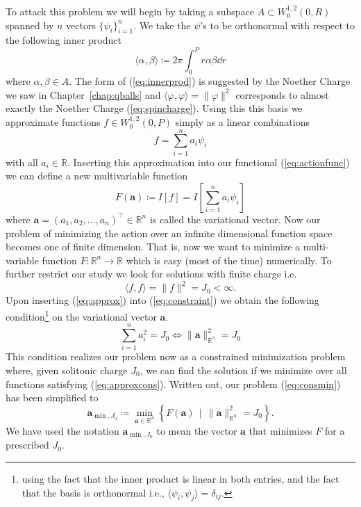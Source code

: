 To attack this problem we will begin by taking a subspace
\(A\subset W^{1,2}_0(0,R)\) spanned by \(n\) vectors \(\{\psi_i\}_{i = 1}^n\).
We take the \(\psi\)'s to be orthonormal with respect to the following inner
product
\begin{equation}\label{eq:innerprod}
    \langle\alpha,\beta\rangle\coloneqq 2\pi\int_0^P r\alpha\beta\dd{r}
\end{equation}
where \(\alpha,\beta\in A\).
The form of (\ref{eq:innerprod}) is suggested by the Noether Charge we saw in
Chapter~\ref{chap:qballs} and \(\langle\varphi,\varphi\rangle = \|\varphi\|^2\)
corresponds to almost exactly the Noether Charge (\ref{eq:spincharge}). Using
this this basis we approximate functions \(f \in W_0^{1,2}(0, P)\) simply as a
linear combinations
\begin{equation}\label{eq:approx}
    f = \sum_{i = 1}^n a_i\psi_i
\end{equation}
with all \(a_i\in \mathbb{R}\). Inserting this approximation into our functional
(\ref{eq:actionfunc}) we can define a new multivariable function
\begin{equation}\label{eq:objfun}
    F(\mathbf{a}) \coloneqq I[f] = I\!\left[\sum_{i = 1}^n a_i\psi_i\right]
\end{equation}
where \(\mathbf{a} = (a_1, a_2,\ldots, a_n)^\intercal\in \mathbb{R}^n\) is
called the variational vector. Now our problem of minimizing the action over an
infinite dimensional function space becomes one of finite dimension. That is,
now we want to minimize a multi-variable function \(F:\mathbb{R}^n\to\mathbb{R}\)
which is easy (most of the time) numerically. To further restrict our study we
look for solutions with finite charge i.e.
\begin{equation}\label{eq:constraint}
    \langle f, f \rangle = \|f\|^2 = J_0 < \infty.
\end{equation}
Upon inserting (\ref{eq:approx}) into (\ref{eq:constraint}) we obtain the
following condition\footnote{using the fact that the inner product is linear in
both entries, and the fact that the basis is orthonormal i.e.,
\(\langle \psi_i,\psi_j\rangle = \delta_{ij}\).} on the variational vector
\(\mathbf{a}\).
    \begin{equation}\label{eq:approxcons}
\sum_{i = 1}^n a_i^2 = J_0 \iff \|\mathbf{a}\|^2_{\mathbb{R}^n} = J_0
\end{equation}
This condition realizes our problem now as a constrained minimization problem
where, given solitonic charge \(J_0\), we can find the solution if we minimize
over all functions satisfying (\ref{eq:approxcons}). Written out, our problem
(\ref{eq:consmin}) has been simplified to
\begin{equation}\label{eq:problem}
    \mathbf{a}_{\min, J_0}\coloneqq \min_{\mathbf{a}\in\mathbb{R}^n}\left\{F(\mathbf{a}) \,\mid\, \|\mathbf{a}\|^2_{\mathbb{R}^n} = J_0\right\}.
\end{equation}
We have used the notation \(\mathbf{a}_{\min, J_0}\) to mean the vector
\(\mathbf{a}\) that minimizes \(F\) for a prescribed \(J_0\).

